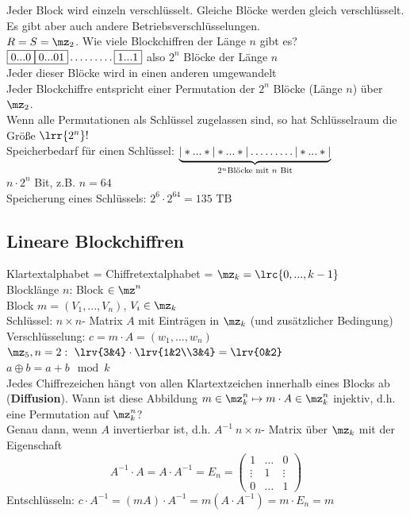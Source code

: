 	Jeder Block wird einzeln verschlüsselt. Gleiche Blöcke werden gleich verschlüsselt. Es gibt aber auch andere Betriebsverschlüsselungen.\\
	$R=S=\mz_2$. Wie viele Blockchiffren der Länge $n$ gibt es?\\
	$\fbox{0...0}\fbox{0...01}\dots\dots\dots\fbox{1...1}$ also $2^n$ Blöcke der Länge $n$\\
	Jeder dieser Blöcke wird in einen anderen umgewandelt\\
	Jeder Blockchiffre entspricht einer Permutation der $2^n$ Blöcke (Länge $n$) über $\mz_2$.\\
	Wenn alle Permutationen als Schlüssel zugelassen sind, so hat Schlüsselraum die Größe $\lrr{2^n}!$\\
Speicherbedarf für einen Schlüssel: $\underbrace{|*...*|*...*|\dots\dots\dots|*...*|}_{2^n\mbox{\scriptsize Blöcke mit }n\mbox{\scriptsize\ Bit}}$\\
	$n\cdot 2^n$ Bit, z.B. $n=64$\\
	Speicherung eines Schlüssels: $2^6\cdot 2^{64}=135\mbox{ TB}$
	
	\subsection{Lineare Blockchiffren}
		Klartextalphabet = Chiffretextalphabet = $\mz_k=\lrc{0,...,k-1}$\\
		Blocklänge $n$: Block $\in\mz^n$\\
		Block $m=(V_1,...,V_n)$, $V_i\in\mz_k$\\
		Schlüssel: $n\times n$- Matrix $A$ mit Einträgen in $\mz_k$ (und zusätzlicher Bedingung)\\
		Verschlüsselung: $c=m\cdot A=(w_1,...,w_n)$\\
		$\mz_5,n=2:\ \lrv{3&4}\cdot\lrv{1&2\\3&4}=\lrv{0&2}$\\
		$a\oplus b=a+b\mod k$\\
		Jedes Chiffrezeichen hängt von allen Klartextzeichen innerhalb eines Blocks ab\\(\textbf{Diffusion}).
\newpage
		Wann ist diese Abbildung $m\in\mz_k^n\mapsto m\cdot A\in\mz_k^n$ injektiv, d.h. eine Permutation auf $\mz_k^n$?\\
		Genau dann, wenn $A$ invertierbar ist, d.h. $A^{-1}\ n\times n$- Matrix über $\mz_k$ mit der Eigenschaft 
		$$A^{-1}\cdot A=A\cdot A^{-1}=E_n=\begin{pmatrix}1&\dots&0\\\vdots&1&\vdots\\0&\dots&1\end{pmatrix}$$
		Entschlüsseln: $c\cdot A^{-1}=(mA)\cdot A^{-1}=m(A\cdot A^{-1})=m\cdot E_n=m$
		
